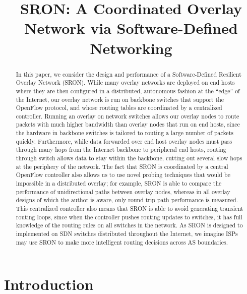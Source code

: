 \documentclass[pageno]{jpaper}
\begin{document}
\title{
SRON: A Coordinated Overlay Network via Software-Defined Networking
}
\date{}
\maketitle

\thispagestyle{empty}

\begin{abstract}

	In this paper, we consider the design and performance of a Software-Defined
Resilient Overlay Network (SRON). While many overlay networks are deployed
on end hosts where they are then configured in a distributed, autonomous
fashion at the ``edge'' of the Internet, our overlay network is run on backbone
switches that support the OpenFlow protocol, and 
whose routing tables are coordinated by a centralized controller.  Running 
an overlay on network switches allows our overlay nodes to route packets with much higher
bandwidth than overlay nodes that run on end hosts, since the hardware in backbone
switches is tailored to routing a large number of packets quickly.  Furthermore, while data forwarded 
over end host overlay nodes must pass through many hops from the Internet backbone to peripheral
end hosts, routing through switch allows data to stay within the backbone, cutting out
several slow hops at the periphery of the network.  The fact that SRON is coordinated by 
a central OpenFlow controller also allows us to use novel probing techniques that would be impossible in a 
distributed overlay; for example, SRON is able to compare the performance of unidirectional 
paths between overlay nodes, whereas in all overlay designs of which the author is aware, only round trip path 
performance is measured.  This centralized controller also means that SRON is able to avoid
generating transient routing loops, since when the controller pushes routing updates to switches, it has 
full knowledge of the routing rules on all switches in the network.
	As SRON is designed to implemented on SDN switches distributed throughout the Internet, we imagine ISPs may use SRON to make more intelligent routing decisions across AS boundaries. 

\end{abstract}

\section{Introduction}
\end{document}
